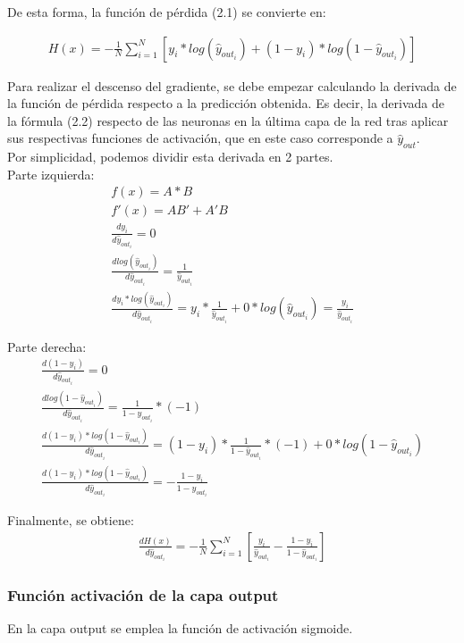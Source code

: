 De esta forma, la función de pérdida (2.1) se convierte en:

\begin{gather}
	H(x) = - \frac{1}{N} \sum_{i=1}^{N}  [y_i * log( \hat{y}_{out_i}) + (1-y_i)*log(1-\hat{y}_{out_i})]
\end{gather}

Para realizar el descenso del gradiente, se debe empezar calculando la derivada de la función de pérdida respecto a la predicción obtenida. Es decir, la derivada de la fórmula (2.2) respecto de las neuronas en la última capa de la red tras aplicar sus respectivas funciones de activación, que en este caso corresponde a $\hat{y}_{out}$. \\
Por simplicidad, podemos dividir esta derivada en 2 partes. \\
Parte izquierda:
\begin{gather}
	f(x) = A*B \\  
	f'(x) = AB' + A'B \\
	\frac{dy_i}{d\hat{y}_{out_i}} = 0 \\
	\frac{dlog(\hat{y}_{out_i} )}{d\hat{y}_{out_i}} = \frac{1}{\hat{y}_{out_i}} \\
	\frac{dy_i * log( \hat{y}_{out_i})}{d\hat{y}_{out_i}} = y_i*\frac{1}{\hat{y}_{out_i}} + 0*log(\hat{y}_{out_i} ) = \frac{y_i}{\hat{y}_{out_i}}
\end{gather}

Parte derecha:
\begin{gather}
	\frac{d(1-y_i)}{d\hat{y}_{out_i}} = 0\\
	\frac{dlog(1-\hat{y}_{out_i})}{d\hat{y}_{out_i}} = \frac{1}{1-\hat{y}_{out_i}} * (-1) \\
	\frac{d(1-y_i)*log(1-\hat{y}_{out_i})}{d\hat{y}_{out_i}} = (1-y_i)*\frac{1}{1-\hat{y}_{out_i}}*(-1) + 0* log(1-\hat{y}_{out_i}) \\
	\frac{d(1-y_i)*log(1-\hat{y}_{out_i})}{d\hat{y}_{out_i}} = -\frac{1-y_i}{1-\hat{y}_{out_i}}
\end{gather}

Finalmente, se obtiene: 
\begin{gather}
	\frac{dH(x)}{d\hat{y}_{out_i}} = - \frac{1}{N} \sum_{i=1}^{N}  [ \frac{y_i}{\hat{y}_{out_i}} - \frac{1-y_i}{1-\hat{y}_{out_i}} ]
\end{gather}

\subsubsection{Función activación de la capa output}
En la capa output se emplea la función de activación sigmoide. 

